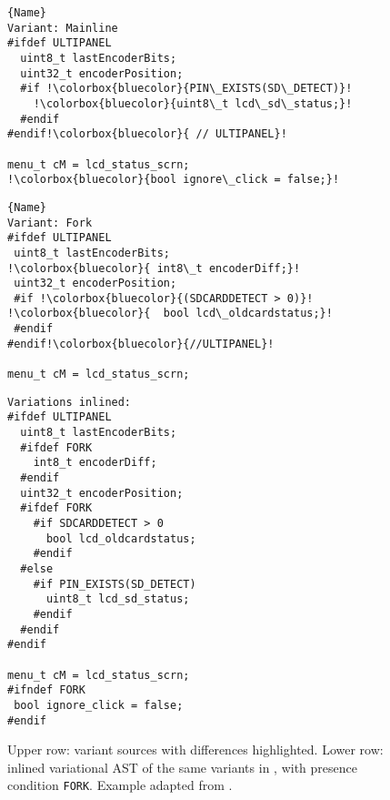\begin{figure}[t]%
\centering
\noindent\begin{minipage}{.40\textwidth}
\begin{lstlisting}[escapechar=!]{Name}
Variant: Mainline
#ifdef ULTIPANEL
  uint8_t lastEncoderBits;
  uint32_t encoderPosition;
  #if !\colorbox{bluecolor}{PIN\_EXISTS(SD\_DETECT)}!
    !\colorbox{bluecolor}{uint8\_t lcd\_sd\_status;}!
  #endif
#endif!\colorbox{bluecolor}{ // ULTIPANEL}!

menu_t cM = lcd_status_scrn;
!\colorbox{bluecolor}{bool ignore\_click = false;}!
\end{lstlisting}
\end{minipage}\qquad
\begin{minipage}{.40\textwidth}
\begin{lstlisting}[escapechar=!]{Name}
Variant: Fork
#ifdef ULTIPANEL
 uint8_t lastEncoderBits;
!\colorbox{bluecolor}{ int8\_t encoderDiff;}!
 uint32_t encoderPosition;
 #if !\colorbox{bluecolor}{(SDCARDDETECT > 0)}!
!\colorbox{bluecolor}{  bool lcd\_oldcardstatus;}!
 #endif
#endif!\colorbox{bluecolor}{//ULTIPANEL}!

menu_t cM = lcd_status_scrn;
\end{lstlisting}
\end{minipage}
\vspace{5mm}

\begin{minipage}{.40\textwidth}
\begin{lstlisting}[escapechar=!]
Variations inlined:
#ifdef ULTIPANEL
  uint8_t lastEncoderBits;
  #ifdef FORK
    int8_t encoderDiff;
  #endif
  uint32_t encoderPosition;
  #ifdef FORK
    #if SDCARDDETECT > 0
      bool lcd_oldcardstatus;
    #endif
  #else
    #if PIN_EXISTS(SD_DETECT)
      uint8_t lcd_sd_status;
    #endif
  #endif
#endif

menu_t cM = lcd_status_scrn;
#ifndef FORK
 bool ignore_click = false;
#endif
\end{lstlisting}
\end{minipage}

    \caption{Upper row: variant sources with differences highlighted. Lower row: inlined variational AST of the same variants in \tooln, with presence condition \texttt{FORK}. Example adapted from \cite{lillack2017intentions}.}
    \label{fig:incline-ast}
\end{figure}
